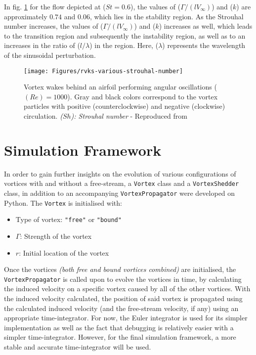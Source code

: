 In fig. \ref{fig:rvks-various-stouhal-number} for the flow depicted at ($St = 0.6$), the values of ($\Gamma / (l V_{\infty})$) and ($k$) are approximately $0.74$ and $0.06$, which lies in the stability region. As the Strouhal number increases, the values of  ($\Gamma / (l V_{\infty})$) and ($k$) increases as well, which leads to the transition region and subsequently the instability region, as well as to an increases in the ratio of ($l/\lambda$) in the region. Here, ($\lambda$) represents the wavelength of the sinusoidal perturbation.
\begin{figure}
	\centering
	\texttt{[image: Figures/rvks-various-strouhal-number]}
	\caption{Vortex wakes behind an airfoil performing angular oscillations ($(Re) = 1000$). Gray and black colors correspond to the vortex particles with positive (counterclockwise) and negative (clockwise) circulation. \emph{($Sh$): Strouhal number} - Reproduced from \parencite{Dynnikova2021}}
	\label{fig:rvks-various-stouhal-number}
\end{figure}

\section{Simulation Framework}
In order to gain further insights on the evolution of various configurations of vortices with and without a free-stream, a \texttt{Vortex} class and a \texttt{VortexShedder} class, in addition to an accompanying \texttt{VortexPropagator} were developed on Python.
The \texttt{Vortex} is initialised with:
\begin{itemize}
	\item Type of vortex: \texttt{"free"} or \texttt{"bound"}
	\item $\Gamma$: Strength of the vortex
	\item $r$: Initial location of the vortex
\end{itemize}
Once the vortices \textit{(both free and bound vortices combined)} are initialised, the \texttt{VortexPropagator} is called upon to evolve the vortices in time, by calculating the induced velocity on a specific vortex caused by all of the other vortices. With the induced velocity calculated, the position of said vortex is propagated using the calculated induced velocity (and the free-stream velocity, if any) using an appropriate time-integrator. For now, the Euler integrator is used for its simpler implementation as well as the fact that debugging is relatively easier with a simpler time-integrator. However, for the final simulation framework, a more stable and accurate time-integrator will be used.

